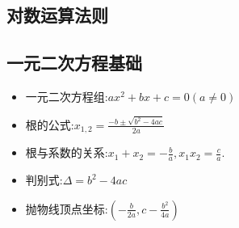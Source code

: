 \documentclass[12pt, a4paper, oneside, UTF8]{ctexbook}  %
\begin{document}
\begin{sloppypar}
    \subsection{对数运算法则}
    \begin{center}
    \end{center}
    \subsection{一元二次方程基础}
    \begin{itemize}
        \item 一元二次方程组:$a x^2 +bx+c=0(a \neq 0)$
        \item 根的公式:$x_{1,2}=\frac{-b\pm\sqrt{b^2-4ac}}{2a}$
        \item 根与系数的关系:$x_{1}+x_{2}=-\frac{b}{a},x_{1}x_{2}=\frac{c}{a}.$
        \item 判别式:$\Delta=b^2-4ac$
        \item 抛物线顶点坐标:$(-\frac{b}{2a},c-\frac{b^2}{4a})$
    \end{itemize}

\end{sloppypar}
\end{document}
